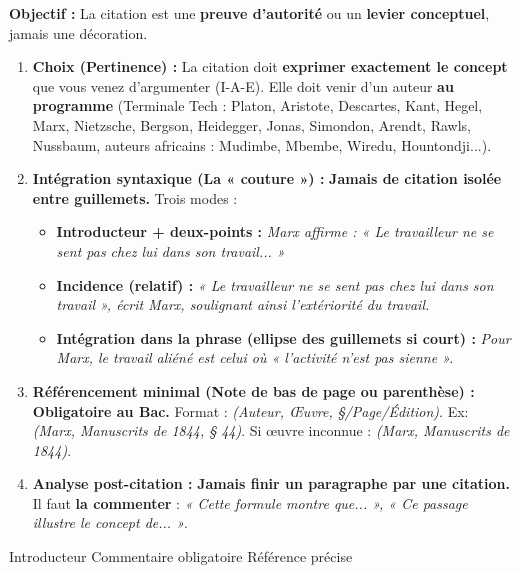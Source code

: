 \documentclass[11pt]{article}
\newcommand{\cle}[1]{{\popxbold\color{popdark}#1}}
\begin{document}
\begin{methode}
\textbf{Objectif :} La citation est une \textbf{preuve d'autorité} ou un \textbf{levier conceptuel}, jamais une décoration.
\begin{enumerate}
    \item \textbf{Choix (Pertinence) :} La citation doit \textbf{exprimer exactement le concept} que vous venez d'argumenter (I-A-E). Elle doit venir d'un auteur \textbf{au programme} (Terminale Tech : Platon, Aristote, Descartes, Kant, Hegel, Marx, Nietzsche, Bergson, Heidegger, Jonas, Simondon, Arendt, Rawls, Nussbaum, auteurs africains : Mudimbe, Mbembe, Wiredu, Hountondji...).
    \item \textbf{Intégration syntaxique (La « couture ») :} \textbf{Jamais de citation isolée entre guillemets.} Trois modes :
        \begin{itemize}
            \item \textbf{Introducteur + deux-points :} \emph{Marx affirme : « Le travailleur ne se sent pas chez lui dans son travail... »}
            \item \textbf{Incidence (relatif) :} \emph{« Le travailleur ne se sent pas chez lui dans son travail », écrit Marx, soulignant ainsi l'extériorité du travail.}
            \item \textbf{Intégration dans la phrase (ellipse des guillemets si court) :} \emph{Pour Marx, le travail aliéné est celui où « l'activité n'est pas sienne ».}
        \end{itemize}
    \item \textbf{Référencement minimal (Note de bas de page ou parenthèse) :} \textbf{Obligatoire au Bac.} Format : \emph{(Auteur, Œuvre, §/Page/Édition)}. Ex: \emph{(Marx, Manuscrits de 1844, § 44)}. Si œuvre inconnue : \emph{(Marx, Manuscrits de 1844)}.
    \item \textbf{Analyse post-citation :} \textbf{Jamais finir un paragraphe par une citation.} Il faut \textbf{la commenter} : \emph{« Cette formule montre que... », « Ce passage illustre le concept de... »}.
\end{enumerate}
\cle{Introducteur} \cle{Commentaire obligatoire} \cle{Référence précise}
\end{methode}
\end{document}
